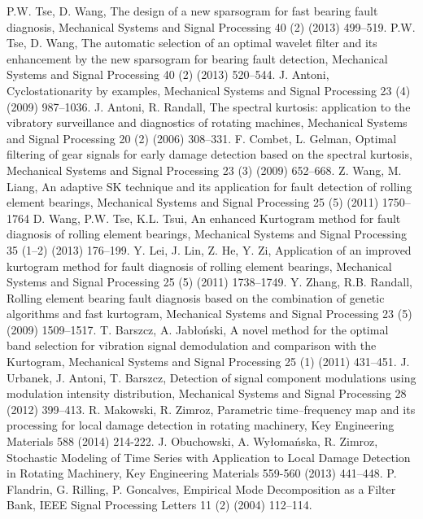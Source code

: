 \documentclass[3p,times]{elsarticle}
\begin{document}
\begin{thebibliography}{00}
	P.W. Tse, D. Wang, The design of a new sparsogram for fast bearing fault diagnosis, Mechanical Systems and Signal Processing 40 (2) (2013) 499--519.
	P.W. Tse, D. Wang, The automatic selection of an optimal wavelet filter and its enhancement by the new sparsogram for bearing fault detection, Mechanical Systems and Signal Processing 40 (2) (2013) 520--544.
 J. Antoni,  Cyclostationarity by examples, Mechanical Systems and Signal Processing 23 (4) (2009) 987--1036.
 J. Antoni, R. Randall, The spectral kurtosis: application to the vibratory surveillance and diagnostics of rotating machines, Mechanical Systems and Signal Processing 20 (2) (2006) 308--331.
 F. Combet, L. Gelman,  Optimal filtering of gear signals for early damage detection based on the spectral kurtosis, Mechanical Systems and Signal Processing 23 (3) (2009) 652--668.
 Z. Wang, M. Liang, An adaptive SK technique and its application for fault detection of rolling element bearings, Mechanical Systems and Signal Processing 25 (5) (2011) 1750--1764
 D. Wang, P.W. Tse, K.L. Tsui, An enhanced Kurtogram method for fault diagnosis of rolling element bearings, Mechanical Systems and Signal Processing 35 (1--2) (2013) 176--199.
 Y. Lei, J. Lin, Z. He, Y. Zi, Application of an improved kurtogram method for fault diagnosis of rolling element bearings, Mechanical Systems and Signal Processing 25 (5) (2011) 1738--1749.
 Y. Zhang, R.B. Randall, Rolling element bearing fault diagnosis based on the combination of genetic algorithms and fast kurtogram, Mechanical Systems and Signal Processing 23 (5) (2009) 1509--1517.
 T. Barszcz, A. Jab{\l}o{\'n}ski, A novel method for the optimal band selection for vibration signal demodulation and comparison with the Kurtogram, Mechanical Systems and Signal Processing 25 (1) (2011) 431--451.
 J. Urbanek, J. Antoni, T. Barszcz, Detection of signal component modulations using modulation intensity distribution, Mechanical Systems and Signal Processing 28 (2012) 399--413.
 R. Makowski, R. Zimroz, Parametric time--frequency map and its processing for local damage detection in rotating machinery, Key Engineering Materials 588 (2014) 214-222.
 J. Obuchowski, A. Wy{\l}oma{\'n}ska, R. Zimroz, Stochastic Modeling of Time Series with Application to Local Damage Detection in Rotating Machinery, Key Engineering Materials 559-560 (2013) 441--448.
 P. Flandrin, G. Rilling, P. Goncalves, Empirical Mode Decomposition as a Filter Bank, IEEE Signal Processing Letters 11 (2) (2004) 112--114.

\end{thebibliography}
\end{document}
